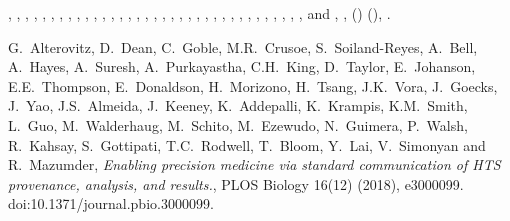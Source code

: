 \documentclass[ds,v1.1.2,openaccess]{iosart2x}%
\begin{document}
\begin{thebibliography}{}
%
\begin{barticle}
,
,
,
,
,
,
,
,
,
,
,
,
,
,
,
,
,
,
,
,
,
,
,
,
,
,
,
,
,
,
,
,
,
,
,
 and
,
,
()
(),
.
\end{barticle}
%
\OrigBibText
G.~Alterovitz,
D.~Dean,
C.~Goble,
M.R.~Crusoe,
S.~Soiland-Reyes,
A.~Bell,
A.~Hayes,
A.~Suresh,
A.~Purkayastha,
C.H.~King,
D.~Taylor,
E.~Johanson,
E.E.~Thompson,
E.~Donaldson,
H.~Morizono,
H.~Tsang,
J.K.~Vora,
J.~Goecks,
J.~Yao,
J.S.~Almeida,
J.~Keeney,
K.~Addepalli,
K.~Krampis,
K.M.~Smith,
L.~Guo,
M.~Walderhaug,
M.~Schito,
M.~Ezewudo,
N.~Guimera,
P.~Walsh,
R.~Kahsay,
S.~Gottipati,
T.C.~Rodwell,
T.~Bloom,
Y.~Lai,
V.~Simonyan and
R.~Mazumder,
\textit{Enabling precision medicine via standard communication of {HTS}
provenance, analysis, and results.},
{PLOS} Biology
16(12)
(2018),
e3000099.
doi:10.1371/journal.pbio.3000099.
\endOrigBibText
{}
\endbibitem


\end{thebibliography}
\end{document}
